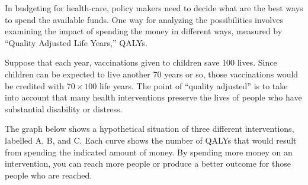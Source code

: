 \begin{knitrout}
\color{fgcolor}\begin{kframe}


{\ttfamily\noindent{}}

{\ttfamily\noindent\bfseries{}}

{\ttfamily\noindent\bfseries\color{errorcolor}{\#\# Error in eval(expr, envir, enclos): object '..' not found}}\end{kframe}
\end{knitrout}


In budgeting for health-care,  policy makers need to decide what are
the best ways to spend the available funds.  One way for analyzing the
possibilities involves examining the impact of spending the money in
different ways, measured by ``Quality Adjusted Life Years,'' QALYs.

Suppose that each year, vaccinations given to children save 100
lives.  Since children can be expected to live another 70 years or so,
those vaccinations would be credited with $70 \times 100$ life years.
The point of ``quality adjusted'' is to take into account that many
health interventions preserve the lives of people who have substantial
disability or distress.

The graph below shows a hypothetical situation of three different
interventions, labelled A, B, and C.  Each curve shows the number of
QALYs that would result from spending the indicated amount of money.
By spending more money on an intervention, you can reach more people
or produce a better outcome for those people who are reached.  




